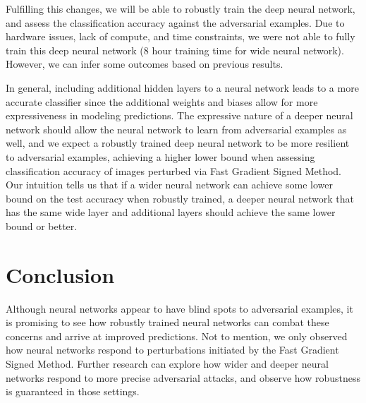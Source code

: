 \documentclass{article}
\begin{document}
Fulfilling this changes, we will be able to robustly train the deep neural network, and assess the
classification accuracy against the adversarial examples. Due to hardware issues, lack of compute, 
and time constraints, we were not able to fully train this deep neural network (8 hour training 
time for wide neural network). However, we can infer some outcomes based on previous results.

In general, including additional hidden layers to a neural network leads to a more accurate
classifier since the additional weights and biases allow for more expressiveness in modeling 
predictions. The expressive nature of a deeper neural network should allow the neural network to
learn from adversarial examples as well, and we expect a robustly trained deep neural network to be
more resilient to adversarial examples, achieving a higher lower bound when assessing classification
accuracy of images perturbed via Fast Gradient Signed Method. Our intuition tells us that if a
wider neural network can achieve some lower bound on the test accuracy when robustly trained, a
deeper neural network that has the same wide layer and additional layers should achieve the same
lower bound or better.

\section{Conclusion}

Although neural networks appear to have blind spots to adversarial examples, it is promising to see
how robustly trained neural networks can combat these concerns and arrive at improved predictions. 
Not to mention, we only observed how neural networks respond to perturbations initiated by the Fast
Gradient Signed Method. Further research can explore how wider and deeper neural networks respond
to more precise adversarial attacks, and observe how robustness is guaranteed in those settings.
\end{document}
